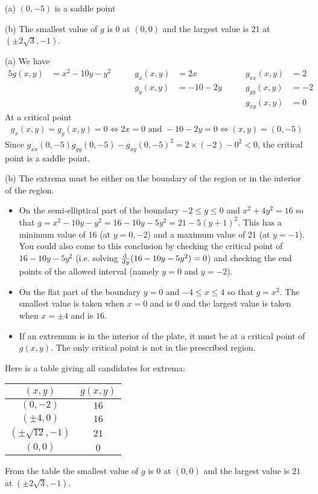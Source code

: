 %

\begin{answer}
(a) $(0,-5)$ is a saddle point

(b) The smallest value of $g$ is $0$ at $(0,0)$
and the largest value is $21$ at $(\pm 2\sqrt{3},-1)$.
\end{answer}

\begin{solution}
(a)
We have
\begin{alignat*}{5}
g(x,y)&=x^2-10y-y^2 \qquad&
g_x(x,y)&=2x \qquad&
g_{xx}(x,y)&=2\\
 & & g_y(x,y)&=-10-2y\qquad &
g_{yy}(x,y)&=-2 \\
 & & & &g_{xy}(x,y)&=0
\end{alignat*}
At a critical point
\begin{align*}
g_x(x,y)=g_y(x,y)=0
\iff 2x=0\text{ and }-10-2y=0
\iff (x,y)=(0,-5)
\end{align*}
Since $g_{xx}(0,-5)g_{yy}(0,-5)-g_{xy}(0,-5)^2=2\times(-2)-0^2<0$,
the critical point is a saddle point.

(b)
The extrema must be either on the boundary of the region
or in the interior of the region. 
\begin{itemize}
\item 
On the semi-elliptical part of the boundary $-2\le y\le 0$ 
and $x^2+4y^2=16$ so that $g=x^2-10y-y^2=16-10y-5y^2=21-5(y+1)^2$. This has 
a minimum value of 16 (at $y=0,-2$) and a maximum value of 21 (at $y=-1$).
You could also come to this conclusion by checking the critical point
of  $16-10y-5y^2$ (i.e. solving $\diff{}{y}(16-10y-5y^2)=0$)
and checking the end points of the allowed interval (namely $y=0$ and $y=-2$).

\item 
On the flat part of the boundary $y=0$ and
$-4\le x\le 4$ so that $g=x^2$.  
The smallest value is taken when $x=0$ and is $0$ and the largest value
is taken when $x=\pm 4$ and is $16$.
\item 
If an extremum is in the interior of the plate,
it must be at a critical point of $g(x,y)$. The only critical point is
not in the prescribed region.
\end{itemize}
Here is a table giving all candidates for extrema:
\begin{center}
\renewcommand{\arraystretch}{1.3}
     \begin{tabular}{|c|c|}
     \hline
       $(x,y)$  & $g(x,y)$ \\ \hline
       $(0,-2)$ & $16$ \\ \hline
       $(\pm 4,0)$ & $16$ \\ \hline
       $(\pm \sqrt{12},-1)$ & $21$ \\ \hline 
       $(0,0)$  & $0$ \\ \hline
     \end{tabular}
\renewcommand{\arraystretch}{1.0}
\end{center}
From the table the smallest value of $g$ is $0$ at $(0,0)$
and the largest value is $21$ at $(\pm 2\sqrt{3},-1)$.
\end{solution}


